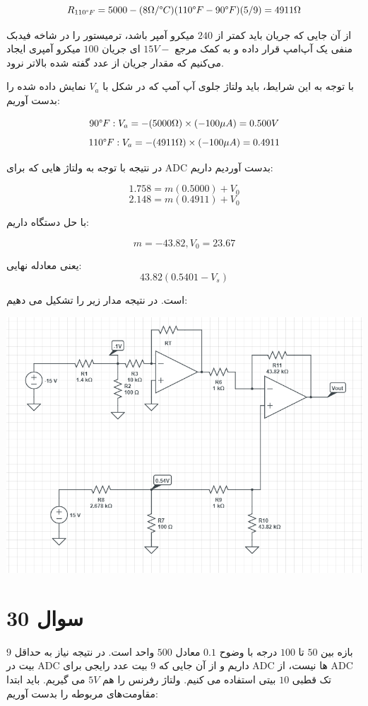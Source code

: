 \documentclass[12pt]{article}
\begin{document}
$$R_{110 \degree F} = 5000 - (8 \Omega / \degree C)(110 \degree F - 90\degree F)(5/9) = 4911 \Omega$$

از آن جایی که جریان باید کمتر از $240$ میکرو آمپر باشد، ترمیستور را در شاخه فیدبک منفی یک آپ‌امپ قرار داده و به کمک مرجع $15V-$ ای جریان $100$ میکرو آمپری ایجاد می‌کنیم که مقدار جریان از عدد گفته شده بالاتر نرود.

با توجه به این شرایط، باید ولتاژ جلوی آپ آمپ که در شکل با $V_a$ نمایش داده شده را بدست آوریم:

$$90 \degree F: V_a = -(5000 \Omega) \times (- 100 \mu A) = 0.500 V$$
$$110 \degree F: V_a = -(4911 \Omega) \times (-100 \mu A) = 0.4911$$

در نتیجه با توجه به ولتاژ هایی که برای ADC بدست آوردیم داریم:

$$1.758 = m(0.5000) + V_0$$
$$2.148 = m (0.4911) + V_0$$

با حل دستگاه داریم:

$$m = -43.82 , V_0 = 23.67$$

یعنی معادله نهایی:
$$43.82(0.5401 - V_s)$$

است. در نتیجه مدار زیر را تشکیل می دهیم:




\begin{center}
	\includegraphics[width = 1.0 \textwidth]{images/7.png}
\end{center}

\newpage 
\section*{سوال 30}

بازه بین $50$ تا $100$ درجه با وضوح $0.1$ معادل $500$ واحد است. در نتیجه نیاز به حداقل $9$ بیت در ADC داریم و از آن جایی که $9$ بیت عدد رایجی برای ADC ها نیست، از ADC تک قطبی $10$ بیتی استفاده می کنیم. ولتاژ رفرنس را هم $5V$ می گیریم.  باید ابتدا مقاومت‌های مربوطه را بدست آوریم:
\end{document}
